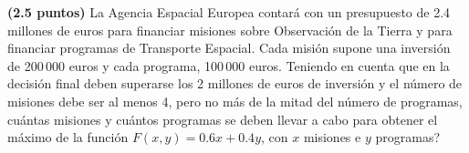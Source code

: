 
\textbf{(2.5 puntos)} La Agencia Espacial Europea contará con un presupuesto
de 2.4 millones de euros para financiar misiones sobre Observación de la Tierra
y para financiar programas de Transporte Espacial. Cada misión supone una
inversión de 200\,000 euros y cada programa, 100\,000 euros. Teniendo en cuenta
que en la decisión final deben superarse los 2 millones de euros de inversión
y el número de misiones debe ser al menos 4, pero no más de la mitad del número
de programas, \textquestiondown{}cuántas misiones y cuántos programas se deben
llevar a cabo para obtener el máximo de la función $F(x,y)=0.6x+0.4y$,
con $x$ misiones e $y$ programas?

